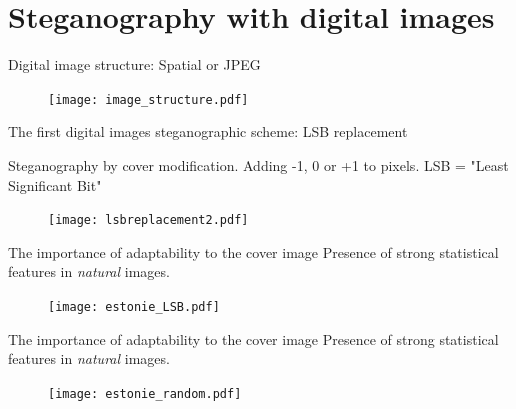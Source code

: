 \documentclass[10pt,aspectratio=169]{beamer}
\begin{document}


\section*{Steganography with digital images}

\begin{frame}{Digital image structure: Spatial or JPEG}

    \begin{figure}[h]
        \texttt{[image: image\_structure.pdf]}
    \end{figure}


\end{frame}


\begin{frame}{The first digital images steganographic scheme: LSB replacement}

    Steganography by cover modification. Adding -1, 0 or +1 to pixels.
    \alert{LSB} = "\alert{L}east \alert{S}ignificant \alert{B}it"
    \begin{figure}[h]
        \texttt{[image: lsbreplacement2.pdf]}
    \end{figure}
\end{frame}

\begin{frame}{The importance of adaptability to the cover image}
    Presence of strong \alert{statistical features} in \textit{natural} images.
    \begin{figure}[h]
        \texttt{[image: estonie\_LSB.pdf]}
    \end{figure}
\end{frame}

\begin{frame}{The importance of adaptability to the cover image}
    Presence of strong \alert{statistical features} in \textit{natural} images.
    \begin{figure}[h]
        \texttt{[image: estonie\_random.pdf]}
    \end{figure}
\end{frame}
\end{document}
